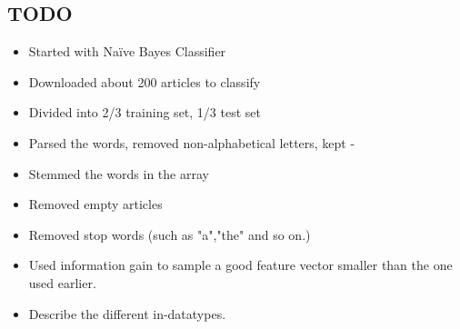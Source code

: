 \subsection{TODO}
\begin{itemize}
\item Started with Naïve Bayes Classifier
\item Downloaded about 200 articles to classify
\item Divided into 2/3 training set, 1/3 test set
\item Parsed the words, removed non-alphabetical letters, kept -
\item Stemmed the words in the array
\item Removed empty articles
\item Removed stop words (such as "a","the" and so on.)
\item Used information gain to sample a good feature vector smaller than the one used earlier.
\item Describe the different in-datatypes.
\end{itemize}
\fi
